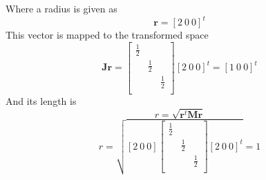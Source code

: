 \documentclass{article}
\begin{document}
Where a radius is given as
\begin{equation}
 \mathbf{r}=\left[2~0~0\right]^t
\end{equation}
This vector is mapped to the transformed space
\begin{equation}
 \mathbf{J}\mathbf{r}=\left[
 \begin{array}{ccc}
   \frac{1}{2}&&\\
   &\frac{1}{2}&\\
   &&\frac{1}{2}\\
 \end{array}\right]\left[2~0~0\right]^t=\left[1~0~0\right]^t
\end{equation}
And its length is
\begin{equation}
 r=\sqrt{\mathbf{r}^t\mathbf{M}\mathbf{r}}
\end{equation}
\begin{equation}
 r=\sqrt{\left[2~0~0\right]\left[
 \begin{array}{ccc}
   \frac{1}{2}&&\\
   &\frac{1}{2}&\\
   &&\frac{1}{2}\\
 \end{array}\right]\left[2~0~0\right]^t}=1
\end{equation}
\end{document}
